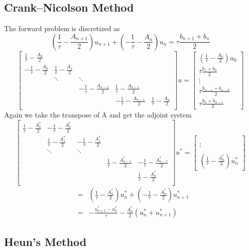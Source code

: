 \documentclass[12pt]{article}
\begin{document}
\subsection{Crank–Nicolson Method}
The forward problem is discretized as
\begin{equation}\label{CNdiscrete}
\left(\frac{1}{\tau}-\frac{A_{n+1}}{2}\right)u_{n+1} + \left(-\frac{1}{\tau}-\frac{A_n}{2}\right)u_n = \tau \frac{b_{n+1} + b_n}{2}
\end{equation}
\begin{equation}
\begin{bmatrix}
\frac{1}{\tau}-\frac{A_0}{2}\\
-\frac{1}{\tau}-\frac{A_0}{2} & \frac{1}{\tau}-\frac{A_1}{2}\\
& \ddots & \ddots\\
& & -\frac{1}{\tau}-\frac{A_{n-2}}{2} & \frac{1}{\tau}-\frac{A_{n-1}}{2} \\
& & & -\frac{1}{\tau}-\frac{A_{n-1}}{2} & \frac{1}{\tau}-\frac{A_{n}}{2} \\
\end{bmatrix}
u = 
\begin{bmatrix}
\left(\frac{1}{\tau}-\frac{A_0}{2}\right)u_0 \\
\tau \frac{b_1 + b_0}{2}\\
\vdots \\
\tau \frac{b_{n-1} + b_{n-2}}{2}\\
\tau \frac{b_n + b_{n-1}}{2}
\end{bmatrix}
\end{equation}
Again we take the transpose of A and get the adjoint system
\begin{equation}
\begin{bmatrix}
\frac{1}{\tau}-\frac{A^*_0}{2} & -\frac{1}{\tau}-\frac{A^*_0}{2}\\
 & \frac{1}{\tau}-\frac{A^*_1}{2} & -\frac{1}{\tau}-\frac{A^*_1}{2}\\
& \ddots & \ddots\\
& & & \frac{1}{\tau}-\frac{A^*_{n-1}}{2} & -\frac{1}{\tau}-\frac{A^*_{n-1}}{2} \\
& & & & \frac{1}{\tau}-\frac{A^*_{n}}{2} \\
\end{bmatrix}
u^* = 
\begin{bmatrix}
\\
\\
\vdots \\
\\
\left(\frac{1}{\tau}-\frac{A^*_{n}}{2}\right)u^*_n
\end{bmatrix}
\end{equation}
\begin{eqnarray}
 & = & \left(\frac{1}{\tau} - \frac{A^*_{n}}{2}\right) u^*_{n} +
\left(-\frac{1}{\tau} - \frac{A^*_{n}}{2}\right) u^*_{n+1}\\
& = & -\frac{u^*_{n+1} - u^*_n}{\tau} - \frac{A^*_{n}}{2} ( u^*_{n} + u^*_{n+1})
\end{eqnarray}
\subsection{Heun's Method}
\end{document}
